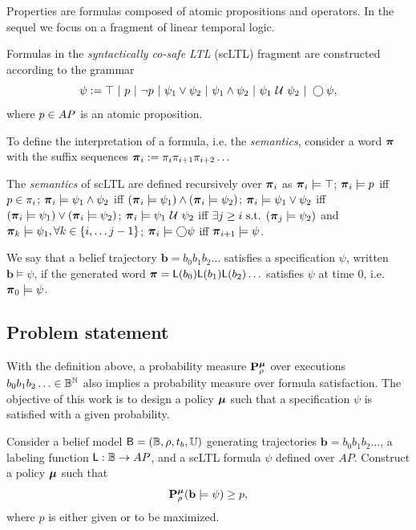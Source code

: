 \documentclass{ifacconf}
\begin{document}
Properties are formulas composed of atomic propositions and operators. In the sequel we focus on a fragment of linear temporal logic.
\begin{definition}
  \label{def:gdtl-syntax}
  Formulas in the \emph{syntactically co-safe LTL} (scLTL) fragment are constructed according to the grammar
  \begin{equation*}
    \label{eq:scLTL}
    \psi :=  \True \ |\ p \ |\ \notltl p \ |\ \psi_1 \vee\psi_2  \ |\ \psi_1 \andltl \psi_2 \ |\ \psi_1 \Until \psi_2 \ |\ \Next \psi,
  \end{equation*}
  where $p\in {AP}$ is an atomic proposition.
\end{definition}

To define the interpretation of a formula, i.e. the \emph{semantics}, consider a word ${\boldsymbol{\pi}}$ with the suffix sequences ${\boldsymbol{\pi}}_i:= \pi_i \pi_{i+1} \pi_{i+2} \ldots$

\begin{definition}
 The \emph{semantics} of scLTL are defined recursively  over ${\boldsymbol{\pi}}_i$ as
    ${\boldsymbol{\pi}}_i \models \top$;
    ${\boldsymbol{\pi}}_i \models p$ iff $p \in \pi_i$;
    ${\boldsymbol{\pi}}_i \models \psi_1 \wedge  \psi_2  $ iff $ ( {\boldsymbol{\pi}}_i \models \psi_1 ) \wedge ( {\boldsymbol{\pi}}_i \models \psi_2 ) $;
    ${\boldsymbol{\pi}}_i \models \psi_1 \vee  \psi_2  $ iff $ ( {\boldsymbol{\pi}}_i \models \psi_1 ) \vee ( {\boldsymbol{\pi}}_i \models \psi_2 ) $;
    ${\boldsymbol{\pi}}_i \models  \psi_1 \ \mathcal{U}\  \psi_2 $ iff $\exists j \geq i \text{ s.t. } ({\boldsymbol{\pi}}_j \models \psi_2 ) $ and ${\boldsymbol{\pi}}_k \models \psi_1, \forall k \in \{i, \ldots j-1\}$;
    ${\boldsymbol{\pi}}_i \models \bigcirc \psi$ iff ${\boldsymbol{\pi}}_{i+1} \models \psi$.
\end{definition}

We say that a belief trajectory $\mathbf{b} = b_0 b_1 b_2 \ldots$ satisfies a specification $\psi$, written $\mathbf{b} \models \psi$, if the generated word ${\boldsymbol{\pi}} =\mathsf{L}(b_0) \mathsf{L}(b_1) \mathsf{L}(b_2) \ldots$ satisfies $\psi$ at time 0, i.e. ${\boldsymbol{\pi}}_0 \models \psi$.


\subsection{Problem statement}

With the definition above, a probability measure $\mathbf{P}_\rho^{\boldsymbol{\mu}}$ over executions $b_0 b_1 b_2 \ldots\in \mathbb{B}^{\mathbb N}$ also implies a probability measure over formula satisfaction. The objective of this work is to design a policy ${\boldsymbol{\mu}}$ such that a specification $\psi$ is satisfied with a given probability.
\begin{problem}
\label{prob:main}
  Consider a belief model $\mathsf{B} = (\mathbb{B}, \rho, t_b, {\mathbb{U}})$ generating trajectories $\mathbf{b} = b_0 b_1 b_2 \ldots$, a labeling function $\mathsf{L} : \mathbb{B} \rightarrow AP$, and a scLTL formula $\psi$ defined over $AP$. Construct a policy ${\boldsymbol{\mu}}$ such that
  \begin{equation}
    \mathbf{P}_\rho^{\boldsymbol{\mu}} ( \mathbf{b} \models \psi )\geq p,
  \end{equation}
  where $p$ is either given or to be maximized.
\end{problem}
\end{document}
